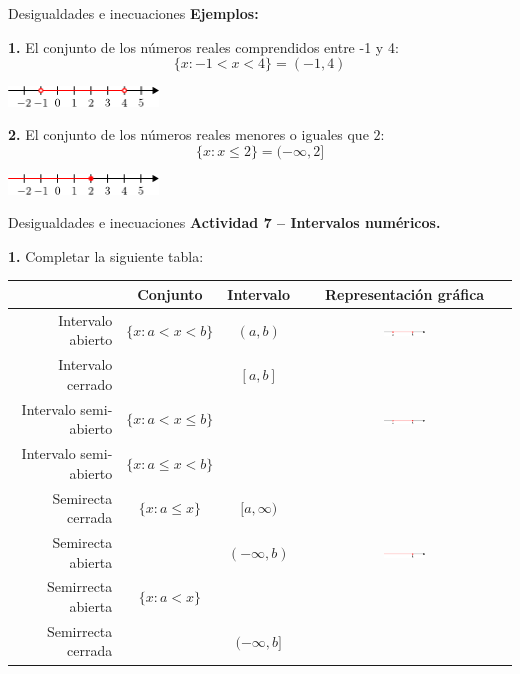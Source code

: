 \documentclass[9pt, aspectratio=169]{beamer}
\begin{document}
\begin{frame}{Desigualdades e inecuaciones}
    \textbf{Ejemplos:} \medskip

    \textbf{1.} El conjunto de los números reales comprendidos entre -1 y 4:
\[ \{x : -1 < x < 4 \} = (-1, 4) \]
\begin{center}
    \includegraphics[width=0.3\textwidth]{figs/fig-05.pdf}
\end{center}

\textbf{2.} El conjunto de los números reales menores o iguales que $2$:
\[ \{x : x \leq 2 \} = (-\infty, 2] \]
\begin{center}
    \includegraphics[width=0.3\textwidth]{figs/fig-06.pdf}
\end{center}
\end{frame}

\begin{frame}{Desigualdades e inecuaciones}
\textbf{Actividad 7 -- Intervalos numéricos.}

\textbf{1.} Completar la siguiente tabla:
\begin{center}
\begin{tabular}{rccc}
\toprule
     & \textbf{Conjunto} & \textbf{Intervalo} & \textbf{Representación gráfica} \\
\midrule
     Intervalo abierto & $\{x : a < x < b\}$ & $(a, b)$ & \includegraphics[width=0.2\textwidth]{figs/fig-02.pdf} \\
     \midrule
     Intervalo cerrado & & $[a, b]$ \\
     \midrule
     Intervalo semi-abierto & $\{x : a < x \leq b\}$ & & \includegraphics[width=0.2\textwidth]{figs/fig-07.pdf} \\
     \midrule
     Intervalo semi-abierto & $\{x : a \leq x <b\}$ & & \\
     \midrule
     Semirecta cerrada & $\{ x : a \leq x \}$ & $[a, \infty)$ & \\
     \midrule
     Semirecta abierta & & $(-\infty, b)$ & \includegraphics[width=0.2\textwidth]{figs/fig-08.pdf} \\
     \midrule
     Semirrecta abierta & $\{x : a < x \}$ & & \\
     \midrule
     Semirrecta cerrada & & $(-\infty, b]$ & \\
     \bottomrule
\end{tabular}  
\end{center}
\end{frame}
\end{document}
